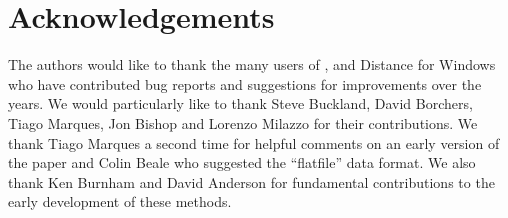\documentclass[article]{jss}
\begin{document}
\section{Acknowledgements}

The authors would like to thank the many users of ,  and Distance for Windows who have contributed bug reports and suggestions for improvements over the years. We would particularly like to thank Steve Buckland, David Borchers, Tiago Marques, Jon Bishop and Lorenzo Milazzo for their contributions. We thank Tiago Marques a second time for helpful comments on an early version of the paper and Colin Beale who suggested the ``flatfile'' data format. We also thank Ken Burnham and David Anderson for fundamental contributions to the early development of these methods.



\end{document}
